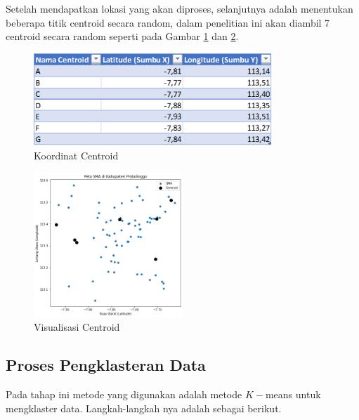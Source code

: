 Setelah mendapatkan lokasi yang akan diproses, selanjutnya adalah menentukan beberapa titik centroid secara random, dalam penelitian ini akan diambil 7 centroid secara random seperti pada Gambar \ref{fig:dasen} dan \ref{fig:visdasen}.

\begin{figure}[h!]
	\centering
	\includegraphics[width=0.8\textwidth]{centroid.png}
	\caption{Koordinat Centroid}
	\label{fig:dasen}
\end{figure}

\begin{figure}[h!]
	\centering
	\includegraphics[width=0.5\textwidth]{titik centroid.png}
	\caption{Visualisasi Centroid}
	\label{fig:visdasen}
\end{figure}

\subsection{Proses Pengklasteran Data}

Pada tahap ini metode yang digunakan adalah metode $K-$means untuk mengklaster data. Langkah-langkah nya adalah sebagai berikut.

